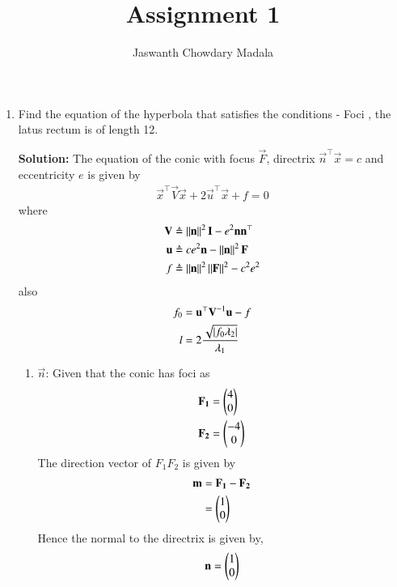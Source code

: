 \documentclass[journal,12pt,twocolumn]{IEEEtran}
\begin{document}
\vspace{3cm}


\title{Assignment 1}
\author{Jaswanth Chowdary Madala}





\maketitle

\newpage


\bigskip

\renewcommand{\thefigure}{\theenumi}
\renewcommand{\thetable}{\theenumi}


\begin{enumerate}
\item Find the equation of the hyperbola that satisfies the conditions - Foci , the latus rectum is of length 12.

\textbf{Solution:}
The equation of the conic with focus $\vec{F}$, directrix $\vec{n}^\top\vec{x} = c$ and eccentricity $e$ is given by
\begin{align}
\vec{x}^\top\vec{V}\vec{x} + 2\vec{u}^\top\vec{x} + f = 0
\label{eq:1}
\end{align}
where
\begin{align}
\mathbf{V} &\triangleq \left\lVert\mathbf{n}\right\rVert^2\mathbf{I} - e^2\mathbf{n}\mathbf{n}^\top \label{eq:2} \\
\mathbf{u} &\triangleq ce^2\mathbf{n} - \left\lVert\mathbf{n}\right\rVert^2\mathbf{F} \label{eq:3} \\
f &\triangleq \left\lVert\mathbf{n}\right\rVert^2\left\lVert\mathbf{F}\right\rVert^2 - c^2e^2 \label{eq:4}
\end{align}
also
\begin{align}
f_0 &= \mathbf{u}^\top\mathbf{V}^{-1}\mathbf{u} - f\\
l &= 2\frac{\sqrt{\left\vert f_0\lambda_2\right\vert}}{\lambda_1}
\end{align}

\begin{enumerate}
\item $\vec{n}$: Given that the conic has foci as
\begin{align}
\mathbf{F_1} &= \begin{pmatrix}4\\0\end{pmatrix}\\
\mathbf{F_2} &= \begin{pmatrix}-4\\0\end{pmatrix}
\end{align}
The direction vector of $F_1F_2$ is given by
\begin{align}
\mathbf{m} &= \mathbf{F_1} - \mathbf{F_2}\\
&= \begin{pmatrix}1\\0\end{pmatrix}
\end{align}
Hence the normal to the directrix is given by,
\begin{align}
\mathbf{n} = \begin{pmatrix}1\\0\end{pmatrix}
\end{align}


\end{enumerate}
\end{enumerate}
\end{document}
